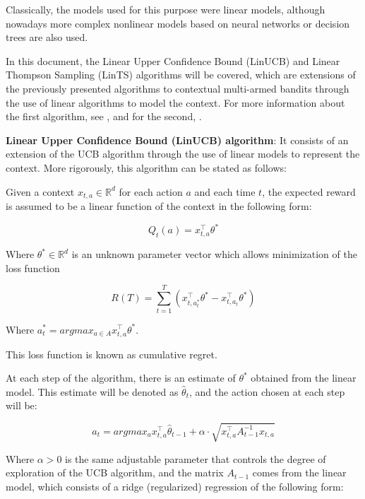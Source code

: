 \documentclass[../main.tex]{subfiles}
\begin{document}
Classically, the models used for this purpose were linear models, although nowadays more 
complex nonlinear models based on neural networks or decision trees are also used.  

In this document, the Linear Upper Confidence Bound (LinUCB) and Linear Thompson Sampling 
(LinTS) algorithms will be covered, which are extensions of the previously presented 
algorithms to contextual multi-armed bandits through the use of linear algorithms to model 
the context. For more information about the first algorithm, see \textcite{zhou2015}, and 
for the second, \textcite{russo2017}.  

\textbf{Linear Upper Confidence Bound (LinUCB) algorithm}: It consists of an extension of 
the UCB algorithm through the use of linear models to represent the context. More 
rigorously, this algorithm can be stated as follows:

Given a context $x_{t, a} \in \mathbb{R}^{d}$ for each action $a$ and each time $t$, the 
expected reward is assumed to be a linear function of the context in the following form:  

\begin{equation*}
    Q_{t}\left(a\right) = x_{t, a}^{\top}\theta^{*}
\end{equation*}

Where $\theta^{*} \in \mathbb{R}^{d}$ is an unknown parameter vector which allows 
minimization of the loss function  

\begin{equation*}
    R\left(T\right) = \sum_{t = 1}^{T} \left(x_{t, a_{t}^{*}}^{\top}\theta^{*} - x_{t, a_{t}}^{\top}\theta^{*}\right)
\end{equation*}

Where $a_{t}^{*} =argmax_{a \in A} x_{t, a}^{\top}\theta^{*}$.  

This loss function is known as cumulative regret.  

At each step of the algorithm, there is an estimate of $\theta^{*}$ obtained from 
the linear model. This estimate will be denoted as $\hat{\theta}_{t}$, and the 
action chosen at each step will be:  

\begin{equation*}
    a_{t} = argmax_{a} x_{t, a}^{\top}\hat{\theta}_{t-1} + \alpha \cdot \sqrt{x_{t, a}^{\top} A_{t-1}^{-1}x_{t, a}}
\end{equation*}

Where $\alpha > 0$ is the same adjustable parameter that controls the degree of 
exploration of the UCB algorithm, and the matrix $A_{t-1}$ comes from the linear 
model, which consists of a ridge (regularized) regression of the following form:  
\end{document}
